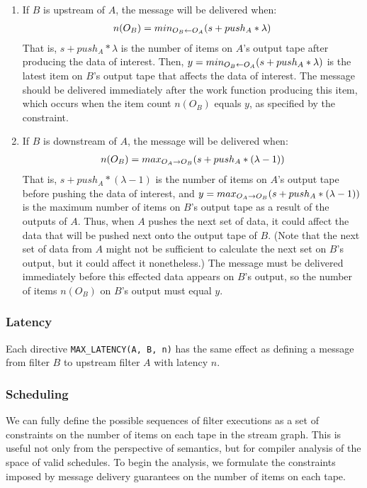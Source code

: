 \begin{enumerate}

\item If $B$ is upstream of $A$, the message will be delivered when:
\begin{align}
\label{eq:msgup}
n(O_B) = min_{O_B \leftarrow O_A}(s + push_A * \lambda)
\end{align}
That is, $s + push_A * \lambda$ is the number of items on $A$'s output tape
after producing the data of interest.  Then, $y =
min_{O_B \leftarrow O_A}(s + push_A * \lambda)$ is the latest item on $B$'s output
tape that affects the data of interest.  The message should be
delivered immediately after the work function producing this item,
which occurs when the item count $n(O_B)$ equals $y$, as specified by
the constraint.

\item If $B$ is downstream of $A$, the message will be delivered when:
\begin{align}
\label{eq:msgdown}
n(O_B) = max_{O_A \rightarrow O_B}(s + push_A * (\lambda-1))
\end{align}
That is, $s + push_A * (\lambda - 1)$ is the number of items on $A$'s
output tape before pushing the data of interest, and $y =
max_{O_A \rightarrow O_B}(s + push_A * (\lambda-1))$ is the maximum number of items
on $B$'s output tape as a result of the outputs of $A$.  Thus, when
$A$ pushes the next set of data, it could affect the data that will be
pushed next onto the output tape of $B$.  (Note that the next set of
data from $A$ might not be sufficient to calculate the next set on
$B$'s output, but it could affect it nonetheless.)  The message must
be delivered immediately before this effected data appears on $B$'s
output, so the number of items $n(O_B)$ on $B$'s output must equal $y$.

\end{enumerate}

\subsubsection{Latency}

Each directive {\tt MAX\_LATENCY(A, B, n)} has the same effect as
defining a message from filter $B$ to upstream filter $A$ with latency
$n$.

\subsubsection{Scheduling}

We can fully define the possible sequences of filter executions as a
set of constraints on the number of items on each tape in the stream
graph.  This is useful not only from the perspective of semantics, but
for compiler analysis of the space of valid schedules.  To begin the
analysis, we formulate the constraints imposed by message delivery
guarantees on the number of items on each tape.

